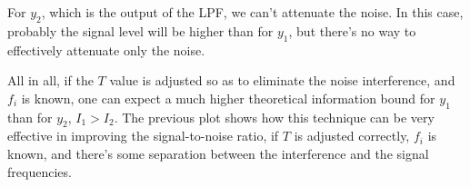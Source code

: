 \noindent For $y_2$, which is the output of the LPF, we can't attenuate the noise. In this case, probably the signal level will be higher than for $y_1$, but there's no way to effectively attenuate only the noise. 

\noindent All in all, if the $T$ value is adjusted so as to eliminate the noise interference, and $f_i$ is known, one can expect a much higher theoretical information bound for $y_1$ than for $y_2$, $I_1 > I_2$. The previous plot shows how this technique can be very effective in improving the signal-to-noise ratio, if $T$ is adjusted correctly, $f_i$ is known, and there's some separation between the interference and the signal frequencies.








   




 

